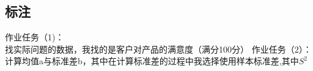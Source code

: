 
\subsection{标注}
作业任务（1)：\\
找实际问题的数据，我找的是客户对产品的满意度（满分100分）
作业任务（2）：\\
计算均值a与标准差b，其中在计算标准差的过程中我选择使用样本标准差,其中$S^2$